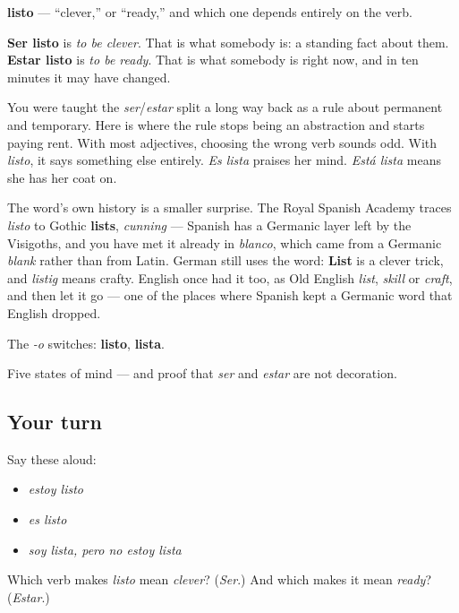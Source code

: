 \begin{cousinweb}
\textbf{listo} — \textquotedblleft{}clever,\textquotedblright{} or \textquotedblleft{}ready,\textquotedblright{} and which one depends entirely on the verb.

\textbf{Ser listo} is \emph{to be clever}. That is what somebody is: a standing fact about them. \textbf{Estar listo} is \emph{to be ready}. That is what somebody is right now, and in ten minutes it may have changed.

You were taught the \emph{ser}/\emph{estar} split a long way back as a rule about permanent and temporary. Here is where the rule stops being an abstraction and starts paying rent. With most adjectives, choosing the wrong verb sounds odd. With \emph{listo}, it says something else entirely. \emph{Es lista} praises her mind. \emph{Está lista} means she has her coat on.

The word's own history is a smaller surprise. The Royal Spanish Academy traces \emph{listo} to Gothic \textbf{lists}, \emph{cunning} — Spanish has a Germanic layer left by the Visigoths, and you have met it already in \emph{blanco}, which came from a Germanic \emph{blank} rather than from Latin. German still uses the word: \textbf{List} is a clever trick, and \emph{listig} means crafty. English once had it too, as Old English \emph{list}, \emph{skill} or \emph{craft}, and then let it go — one of the places where Spanish kept a Germanic word that English dropped.

The \emph{-o} switches: \textbf{listo}, \textbf{lista}.
\end{cousinweb}

\begin{grammarlens}[title={What you've built}]
Five states of mind — and proof that \emph{ser} and \emph{estar} are not decoration.
\end{grammarlens}

\subsection*{Your turn}
Say these aloud:

\begin{itemize}
\raggedright
  \item \emph{estoy listo}
  \item \emph{es listo}
  \item \emph{soy lista, pero no estoy lista}
\end{itemize}

\begin{tcolorbox}[breakable,colback=teal!4,colframe=teal!35!black,title={Before you move on}]
Which verb makes \emph{listo} mean \emph{clever}? (\emph{Ser}.) And which makes it mean \emph{ready}? (\emph{Estar}.)
\end{tcolorbox}
